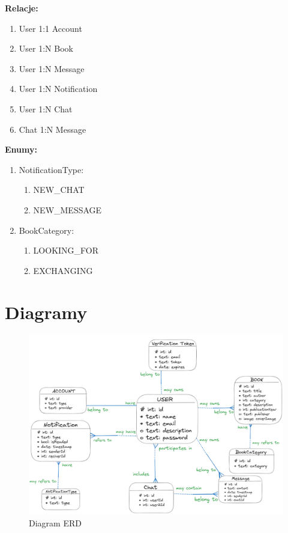 \documentclass[12pt]{article}
\begin{document}
\noindent\hspace{0.6cm}\textbf{\large Relacje:}\vspace{-10pt}
\begin{enumerate}[label=\textbullet, leftmargin=1.2cm, itemsep=-6pt]
	\item User 1:1 Account
	\item User 1:N Book
	\item User 1:N Message
	\item User 1:N Notification
	\item User 1:N Chat
	\item Chat 1:N Message
\end{enumerate}

\noindent\hspace{0.6cm}\textbf{\large Enumy:}\vspace{-10pt}
\begin{enumerate}[label=\textbullet, leftmargin=1.2cm, itemsep=-6pt]
	\item NotificationType:\vspace{-5pt}
	\begin{enumerate}[label=$\circ$]
		\item NEW\_CHAT
		\item NEW\_MESSAGE
	\end{enumerate}
	\item BookCategory:\vspace{-5pt}
	\begin{enumerate}[label=$\circ$]
		\item LOOKING\_FOR
		\item EXCHANGING
	\end{enumerate}
\end{enumerate}

\section{Diagramy}

\begin{figure}[h!]
	\centering
	\includegraphics[width=17cm]{figures/diagramERD.png}
	\caption{Diagram ERD}
\end{figure}
\end{document}
